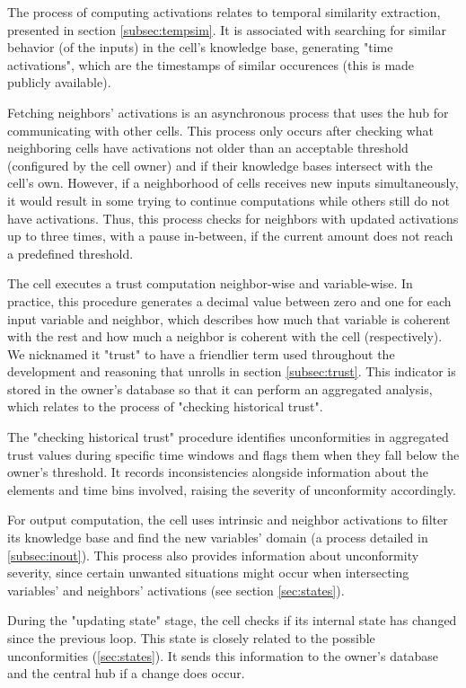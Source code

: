 The process of computing activations relates to temporal similarity extraction, presented in section \ref{subsec:tempsim}. It is associated with searching for similar behavior (of the inputs) in the cell's knowledge base, generating "time activations", which are the timestamps of similar occurences (this is made publicly available).

Fetching neighbors' activations is an asynchronous process that uses the hub for communicating with other cells. This process only occurs after checking what neighboring cells have activations not older than an acceptable threshold (configured by the cell owner) and if their knowledge bases intersect with the cell's own. However, if a neighborhood of cells receives new inputs simultaneously, it would result in some trying to continue computations while others still do not have activations. Thus, this process checks for neighbors with updated activations up to three times, with a pause in-between, if the current amount does not reach a predefined threshold.

The cell executes a trust computation neighbor-wise and variable-wise. In practice, this procedure generates a decimal value between zero and one for each input variable and neighbor, which describes how much that variable is coherent with the rest and how much a neighbor is coherent with the cell (respectively). We nicknamed it "trust" to have a friendlier term used throughout the development and reasoning that unrolls in section \ref{subsec:trust}. This indicator is stored in the owner's database so that it can perform an aggregated analysis, which relates to the process of "checking historical trust".

The "checking historical trust" procedure identifies unconformities in aggregated trust values during specific time windows and flags them when they fall below the owner's threshold. It records inconsistencies alongside information about the elements and time bins involved, raising the severity of unconformity accordingly.

For output computation, the cell uses intrinsic and neighbor activations to filter its knowledge base and find the new variables' domain (a process detailed in \ref{subsec:inout}). This process also provides information about unconformity severity, since certain unwanted situations might occur when intersecting variables' and neighbors' activations (see section \ref{sec:states}).

During the "updating state" stage, the cell checks if its internal state has changed since the previous loop. This state is closely related to the possible unconformities (\ref{sec:states}). It sends this information to the owner's database and the central hub if a change does occur.


